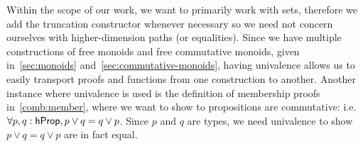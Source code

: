 Within the scope of our work, we want to primarily work with
sets, therefore we add the truncation constructor whenever necessary so we need not concern ourselves
with higher-dimension paths (or equalities). Since we have multiple constructions of free monoids
and free commutative monoids, given in~\ref{sec:monoids} and~\ref{sec:commutative-monoids},
having univalence allows us to easily transport proofs and functions from one construction to another.
Another instance where univalence is used is the definition of membership proofs in~\ref{comb:member},
where we want to show to propositions are commutative: i.e. $\forall p, q: \mathsf{hProp}, p \vee q = q \vee p$.
Since $p$ and $q$ are types, we need univalence to show $p \vee q = q \vee p$ are in fact equal.

